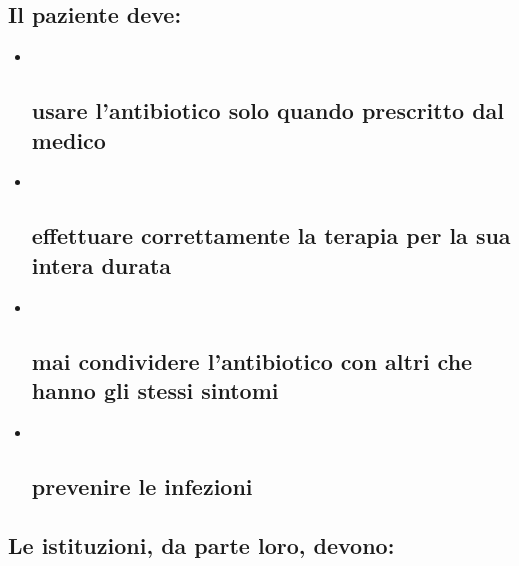 \documentclass[]{article}
\begin{document}
\subsection{\texorpdfstring{Il \textbf{paziente}
deve:}{Il paziente deve:}}\label{il-paziente-deve}

\begin{itemize}
\item ~
  \subsection{usare l'antibiotico solo quando prescritto dal
  medico}\label{usare-lantibiotico-solo-quando-prescritto-dal-medico}
\item ~
  \subsection{effettuare correttamente la terapia per la sua intera
  durata}\label{effettuare-correttamente-la-terapia-per-la-sua-intera-durata}
\item ~
  \subsection{mai condividere l'antibiotico con altri che hanno gli
  stessi
  sintomi}\label{mai-condividere-lantibiotico-con-altri-che-hanno-gli-stessi-sintomi}
\item ~
  \subsection{prevenire le infezioni}\label{prevenire-le-infezioni}
\end{itemize}

\subsection{\texorpdfstring{Le \textbf{istituzioni}, da parte loro,
devono:}{Le istituzioni, da parte loro, devono:}}\label{le-istituzioni-da-parte-loro-devono}
\end{document}
